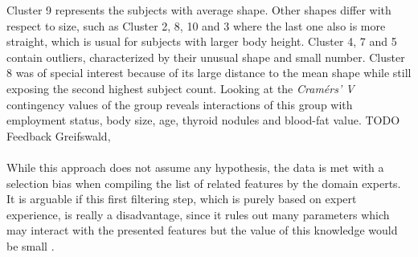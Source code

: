 \documentclass[journal]{style/vgtc} 			          %
\begin{document}
Cluster 9 represents the subjects with average shape.
%
Other shapes differ with respect to size, such as Cluster 2, 8, 10 and 3 where the last one also is more straight, which is usual for subjects with larger body height.
%
Cluster 4, 7 and 5 contain outliers, characterized by their unusual shape and small number.
%
Cluster 8 was of special interest because of its large distance to the mean shape while still exposing the second highest subject count.
%
Looking at the \emph{Cram\'{e}rs' V} contingency values of the group reveals interactions of this group with employment status, body size, age, thyroid nodules and blood-fat value.
%
TODO Feedback Greifswald, 
\\\\
While this approach does not assume any hypothesis, the data is met with a selection bias when compiling the list of related features by the domain experts.
%
It is arguable if this first filtering step, which is purely based on expert experience, is really a disadvantage, since it rules out many parameters which may interact with the presented features but the value of this knowledge would be small \cite{Wiley2008}.
\end{document}
